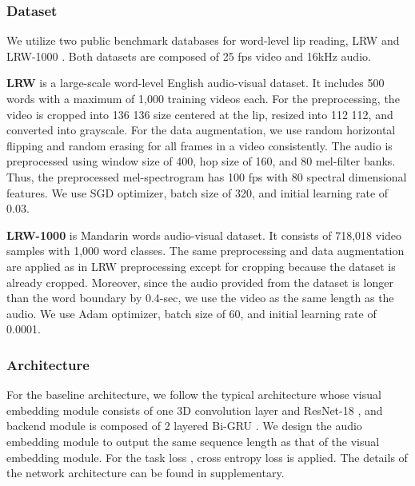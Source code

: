 \documentclass[10pt,twocolumn,letterpaper]{article}
\begin{document}
\vspace{-0.3cm}
\subsubsection{Dataset}
\vspace{-0.2cm}
We utilize two public benchmark databases for word-level lip reading, LRW \cite{chung2016lrw} and LRW-1000 \cite{yang2019lrw1000}. Both datasets are composed of 25 fps video and 16kHz audio.

{\bf LRW} \cite{chung2016lrw} is a large-scale word-level English audio-visual dataset. It includes 500 words with a maximum of 1,000 training videos each. 
For the preprocessing, the video is cropped into 136  136 size centered at the lip, resized into 112  112, and converted into grayscale. For the data augmentation, we use random horizontal flipping and random erasing for all frames in a video consistently. The audio is preprocessed using window size of 400, hop size of 160, and 80 mel-filter banks. Thus, the preprocessed mel-spectrogram has 100 fps with 80 spectral dimensional features. We use SGD optimizer, batch size of 320, and initial learning rate of 0.03. 

{\bf LRW-1000} \cite{yang2019lrw1000} is Mandarin words audio-visual dataset. It consists of 718,018 video samples with 1,000 word classes. 
The same preprocessing and data augmentation are applied as in LRW preprocessing except for cropping because the dataset is already cropped. Moreover, since the audio provided from the dataset is longer than the word boundary by 0.4-sec, we use the video as the same length as the audio. We use Adam \cite{kingma2014adam} optimizer, batch size of 60, and initial learning rate of 0.0001.

\vspace{-0.3cm}
\subsubsection{Architecture}
For the baseline architecture, we follow the typical architecture \cite{petridis2018end, stafylakis2017reslstm} whose visual embedding module consists of one 3D convolution layer and ResNet-18 \cite{he2016resnet}, and backend module is composed of 2 layered Bi-GRU \cite{schuster1997bidirectional}. We design the audio embedding module to output the same sequence length as that of the visual embedding module. For the task loss , cross entropy loss is applied.
The details of the network architecture can be found in supplementary.
\end{document}
